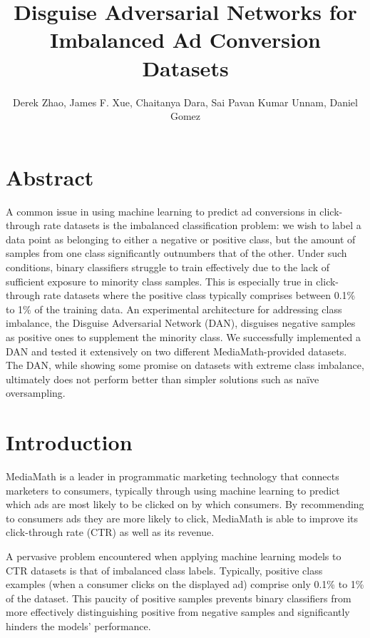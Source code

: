 \documentclass{proc}
\begin{document}
\title{Disguise Adversarial Networks for Imbalanced Ad Conversion Datasets}

\author{Derek Zhao, James F. Xue, Chaitanya Dara, Sai Pavan Kumar Unnam, Daniel Gomez}

\maketitle

\section{Abstract}

A common issue in using machine learning to predict ad conversions in click-through rate datasets is the imbalanced classification problem: we wish to label a data point as belonging to either a negative or positive class, but the amount of samples from one class significantly outnumbers that of the other. Under such conditions, binary classifiers struggle to train effectively due to the lack of sufficient exposure to minority class samples. This is especially true in click-through rate datasets where the positive class typically comprises between 0.1\% to 1\% of the training data. An experimental architecture for addressing class imbalance, the Disguise Adversarial Network (DAN), disguises negative samples as positive ones to supplement the minority class. \cite{DAN} We successfully implemented a DAN and tested it extensively on two different MediaMath-provided datasets. The DAN, while showing some promise on datasets with extreme class imbalance, ultimately does not perform better than simpler solutions such as na\"ive oversampling.

\section{Introduction}

MediaMath is a leader in programmatic marketing technology that connects marketers to consumers, typically through using machine learning to predict which ads are most likely to be clicked on by which consumers. By recommending to consumers ads they are more likely to click, MediaMath is able to improve its click-through rate (CTR) as well as its revenue.

A pervasive problem encountered when applying machine learning models to CTR datasets is that of imbalanced class labels. Typically, positive class examples (when a consumer clicks on the displayed ad) comprise only 0.1\% to 1\% of the dataset. This paucity of positive samples prevents binary classifiers from more effectively distinguishing positive from negative samples and significantly hinders the models' performance.
\end{document}
